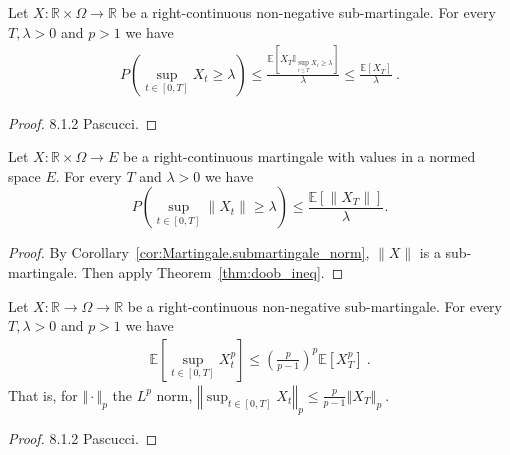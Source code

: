 \begin{theorem}\label{thm:doob_ineq}
  Let $X:\mathbb{R}\times\Omega\rightarrow \mathbb{R}$ be a right-continuous non-negative sub-martingale.
  For every $T, \lambda>0$ and $p>1$ we have
  \begin{align*}
    P\left( \sup_{t\in[0,T]}X_t \geq \lambda \right)
    \leq \frac{\mathbb{E}[X_T \mathbb{I}_{\sup_{i \le T}X_i \ge \lambda}]}{\lambda}
    \leq \frac{\mathbb{E}[X_T]}{\lambda}
    \: .
  \end{align*}
\end{theorem}

\begin{proof}
  8.1.2 Pascucci.
\end{proof}


\begin{corollary}\label{cor:doob_ineq_norm}
  Let $X:\mathbb{R}\times\Omega\rightarrow E$ be a right-continuous martingale with values in a normed space $E$.
  For every $T$ and $\lambda>0$ we have
  $$
  P\left( \sup_{t\in[0,T]} \lVert X_t \rVert \geq \lambda \right)
  \leq \frac{\mathbb{E}[\lVert X_T \rVert]}{\lambda}.
  $$
\end{corollary}

\begin{proof}
  By Corollary~\ref{cor:Martingale.submartingale_norm}, $\lVert X \rVert$ is a sub-martingale.
  Then apply Theorem~\ref{thm:doob_ineq}.
\end{proof}


\begin{theorem}\label{thm:doob_lp}
  Let $X:\mathbb{R} \rightarrow \Omega \rightarrow \mathbb{R}$ be a right-continuous non-negative sub-martingale.
  For every $T, \lambda>0$ and $p>1$ we have
  \begin{align*}
    \mathbb{E}\left[ \sup_{t\in[0,T]}X_t^p \right]
    \leq \left(\frac{p}{p-1}\right)^p\mathbb{E}[X_T^p]
    \: .
  \end{align*}
  That is, for $\Vert \cdot \Vert_p$ the $L^p$ norm,
  $\left\Vert \sup_{t\in[0,T]}  X_t  \right\Vert_p
    \leq \frac{p}{p-1} \left\Vert X_T \right\Vert_p
    \: .$
\end{theorem}

\begin{proof}
8.1.2 Pascucci.
\end{proof}


